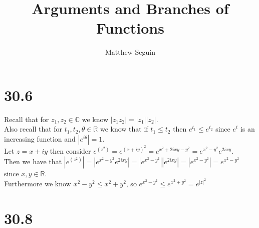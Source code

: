 \documentclass{article}
\title{Arguments and Branches of Functions}
\author{Matthew Seguin}
\date{}
\begin{document}
\maketitle

\section*{30.6}
\begin{center}
    \doublespacing
    Recall that for $z_1, z_2\in\mathbb{C}$ we know $|z_1 z_2| = |z_1||z_2|$.
    \\Also recall that for $t_1, t_2,\theta\in\mathbb{R}$ we know that if $t_1\leq t_2$ then $e^{t_1}\leq e^{t_2}$ since $e^t$ is an increasing function and $|e^{i\theta}| = 1$.
    \\Let $z = x + iy$ then consider $e^{(z^2)} = e^{(x + iy)^2} = e^{x^2 + 2ixy - y^2} = e^{x^2 - y^2} e^{2ixy}$.
    \\Then we have that $|e^{(z^2)}| = |e^{x^2 - y^2} e^{2ixy}| = |e^{x^2 - y^2}||e^{2ixy}| = |e^{x^2 - y^2}| = e^{x^2 - y^2}$ since $x, y\in\mathbb{R}$.
    \\Furthermore we know $x^2 - y^2\leq x^2 + y^2$, so $e^{x^2 - y^2}\leq e^{x^2 + y^2} = e^{|z|^2}$ \qedsymbol
\end{center}


\section*{30.8}
\end{document}
